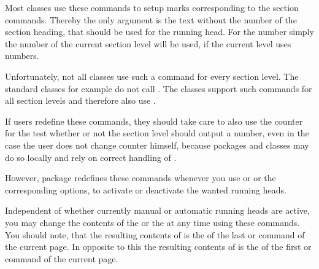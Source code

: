 \begin{Declaration}
\end{Declaration}
Most classes use these commands to setup marks corresponding to the
section commands. Thereby the only argument is the text without the number of
the section heading, that should be used for the running head. For the number
simply the number of the current section level will be used, if the current
level uses numbers.

Unfortunately, not all classes use such a command for
every section level. The standard classes for example do not call
. The \KOMAScript{} classes support such commands for all
section levels and therefore also use .

If users redefine these commands, they should take care
to also use the counter  for the test whether or not the
section level should output a number, even in the case the user
does not change counter  himself, because packages and
classes may do so locally and rely on correct handling of
.

However, package  redefines these commands whenever you use
 or  or the corresponding options, to
activate or deactivate the wanted running heads.%
%
\EndIndexGroup


\begin{Declaration}
\end{Declaration}
Independent of whether currently manual or automatic running heads are active,
you may change the contents of the  or the 
at any time using these commands. You should note, that the resulting contents
of  is the  of the last  or  command of the
current page. In opposite to this the resulting contents of
 is the  of the first
 or  command of the current page.

